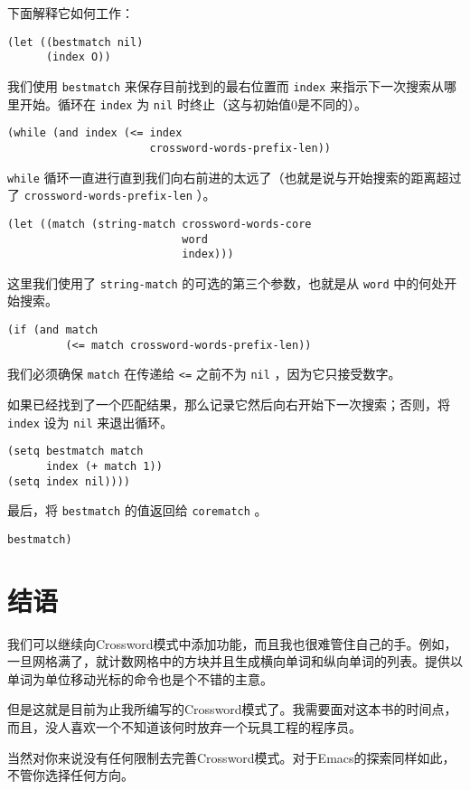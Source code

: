 下面解释它如何工作：

\begin{verbatim}
(let ((bestmatch nil)
      (index O))
\end{verbatim}

我们使用 \texttt{bestmatch} 来保存目前找到的最右位置而 \texttt{index} 来指示下一次搜索从哪里开始。循环在 \texttt{index} 为 \texttt{nil} 时终止（这与初始值0是不同的）。

\begin{verbatim}
(while (and index (<= index
                      crossword-words-prefix-len))
\end{verbatim}

 \texttt{while} 循环一直进行直到我们向右前进的太远了（也就是说与开始搜索的距离超过了 \texttt{crossword-words-prefix-len} ）。

\begin{verbatim}
(let ((match (string-match crossword-words-core
                           word
                           index)))
\end{verbatim}

这里我们使用了 \texttt{string-match} 的可选的第三个参数，也就是从 \texttt{word} 中的何处开始搜索。

\begin{verbatim}
(if (and match
         (<= match crossword-words-prefix-len))
\end{verbatim}

我们必须确保 \texttt{match} 在传递给 \texttt{<=} 之前不为 \texttt{nil} ，因为它只接受数字。

如果已经找到了一个匹配结果，那么记录它然后向右开始下一次搜索；否则，将 \texttt{index} 设为 \texttt{nil} 来退出循环。

\begin{verbatim}
(setq bestmatch match
      index (+ match 1))
(setq index nil))))
\end{verbatim}

最后，将 \texttt{bestmatch} 的值返回给 \texttt{corematch} 。

\begin{verbatim}
bestmatch)
\end{verbatim}

\section{结语}
\label{section:10-Last-Word}

我们可以继续向Crossword模式中添加功能，而且我也很难管住自己的手。例如，一旦网格满了，就计数网格中的方块并且生成横向单词和纵向单词的列表。提供以单词为单位移动光标的命令也是个不错的主意。

但是这就是目前为止我所编写的Crossword模式了。我需要面对这本书的时间点，而且，没人喜欢一个不知道该何时放弃一个玩具工程的程序员。

当然对你来说没有任何限制去完善Crossword模式。对于Emacs的探索同样如此，不管你选择任何方向。
